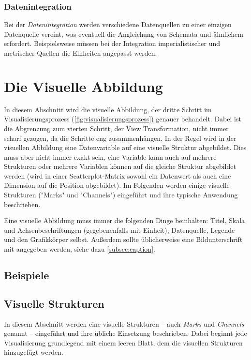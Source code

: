 		\subsubsection{Datenintegration}
			Bei der \emph{Datenintegration} werden verschiedene Datenquellen zu einer einzigen Datenquelle vereint, was eventuell die Angleichung von Schemata und ähnlichem erfordert. Beispielsweise müssen bei der Integration imperialistischer und metrischer Quellen die Einheiten angepasst werden.

\section{Die Visuelle Abbildung}
	\label{sec:visualMapping}

	In diesem Abschnitt wird die visuelle Abbildung, der dritte Schritt im Visualisierungsprozess (\autoref{fig:visualisierungsprozess}) genauer behandelt. Dabei ist die Abgrenzung zum vierten Schritt, der View Transformation, nicht immer scharf gezogen, da die Schritte eng zusammenhängen. In der Regel wird in der visuellen Abbildung eine Datenvariable auf eine visuelle Struktur abgebildet. Dies muss aber nicht immer exakt sein, \dh eine Variable kann auch auf mehrere Strukturen oder mehrere Variablen können auf die gleiche Struktur abgebildet werden (\bspw wird in einer Scatterplot-Matrix sowohl ein Datenwert als auch eine Dimension auf die Position abgebildet). Im Folgenden werden einige visuelle Strukturen ("Marks" und "Channels") eingeführt und ihre typische Anwendung beschrieben.

	Eine visuelle Abbildung muss immer die folgenden Dinge beinhalten: Titel, Skala und Achsenbeschriftungen (gegebenenfalls mit Einheit), Datenquelle, Legende und den Grafikkörper selbst. Außerdem sollte üblicherweise eine Bildunterschrift mit angegeben werden, siehe dazu \autoref{subsec:caption}.

	\subsection{Beispiele}

	\subsection{Visuelle Strukturen}
		In diesem Abschnitt werden eine visuelle Strukturen -- auch \emph{Marks} und \emph{Channels} genannt -- eingeführt und ihre übliche Einsetzung beschrieben. Dabei beginnt jede Visualisierung grundlegend mit einem leeren Blatt, dem die visuellen Strukturen hinzugefügt werden.

